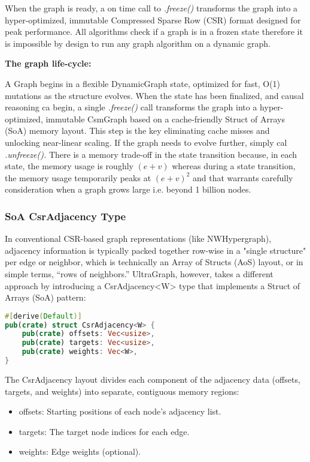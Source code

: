 When the graph is ready, a on time  call to \textit{.freeze()} transforms the graph into a hyper-optimized, immutable Compressed Sparse Row (CSR) format designed for peak performance. All algorithms check if a graph is in a frozen state therefore it is impossible by design to run any graph algorithm on a dynamic graph. 

\textbf{The graph life-cycle:}

A Graph begins in a flexible DynamicGraph state, optimized for fast, O(1) mutations as the structure evolves. When the state has been finalized, and causal reasoning ca begin, a single \textit{.freeze()} call transforms the graph into a hyper-optimized, immutable CsmGraph based on a cache-friendly Struct of Arrays (SoA) memory layout. This step is the key eliminating cache misses and unlocking near-linear scaling. 
If the graph needs to evolve further, simply cal \textit{.unfreeze().} There is a memory trade-off in the state transition because, in each state, the memory usage is roughly $(e+v)$ whereas during a state transition, the memory usage temporarily peaks at $(e+v)^{2}$ and that warrants carefully consideration when a graph grows large i.e. beyond 1 billion nodes. 


\subsubsection{SoA CsrAdjacency Type}

In conventional CSR-based graph representations (like NWHypergraph), adjacency information is typically packed together row-wise in a "single structure" per edge or neighbor, which is technically an Array of Structs (AoS) layout, or in simple terms, “rows of neighbors.” UltraGraph, however, takes a different approach by introducing a CsrAdjacency<W> type that implements a Struct of Arrays (SoA) pattern:

\begin{lstlisting}[language=Rust, label={list:CsrAdjacency}, caption={UltraGraph: CsrAdjacency}]
#[derive(Default)]
pub(crate) struct CsrAdjacency<W> {
    pub(crate) offsets: Vec<usize>,
    pub(crate) targets: Vec<usize>,
    pub(crate) weights: Vec<W>,
}
\end{lstlisting}

\newpage

The CsrAdjacency layout divides each component of the adjacency data (offsets, targets, and weights) into separate, contiguous memory regions:

\begin{itemize}
\item offsets: Starting positions of each node’s adjacency list.
\item targets: The target node indices for each edge.
\item weights: Edge weights (optional).
\end{itemize}

